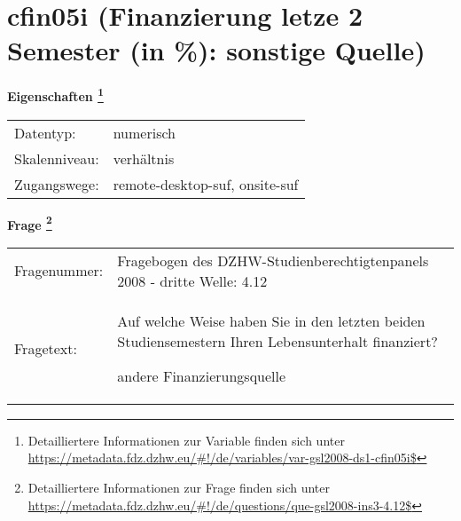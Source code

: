 
    \setcounter{footnote}{0}

    \vspace*{-1.8cm}
	\section{cfin05i (Finanzierung letze 2 Semester (in \%): sonstige Quelle)}
	\label{section:cfin05i}



    \vspace*{0.5cm}
    \noindent\textbf{Eigenschaften
	\footnote{Detailliertere Informationen zur Variable finden sich unter
		\url{https://metadata.fdz.dzhw.eu/\#!/de/variables/var-gsl2008-ds1-cfin05i$}}}\\
	\begin{tabularx}{\hsize}{@{}lX}
	Datentyp: & numerisch \\
	Skalenniveau: & verhältnis \\
	Zugangswege: &
	  remote-desktop-suf, 
	  onsite-suf
 \\
    \end{tabularx}



				\vspace*{0.5cm}
                \noindent\textbf{Frage
	                \footnote{Detailliertere Informationen zur Frage finden sich unter
		              \url{https://metadata.fdz.dzhw.eu/\#!/de/questions/que-gsl2008-ins3-4.12$}}}\\
				\begin{tabularx}{\hsize}{@{}lX}
					Fragenummer: &
					  Fragebogen des DZHW-Studienberechtigtenpanels 2008 - dritte Welle:
					  4.12
 \\
					Fragetext: & Auf welche Weise haben Sie in den letzten beiden Studiensemestern Ihren Lebensunterhalt finanziert?\par  andere Finanzierungsquelle \\
				\end{tabularx}





